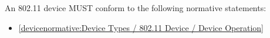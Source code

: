 \label{sec:Conformance / Device Conformance / 802.11 Device Conformance}

An 802.11 device MUST conform to the following normative statements:

\begin{itemize}
\item \ref{devicenormative:Device Types / 802.11 Device / Device Operation}
\end{itemize}
